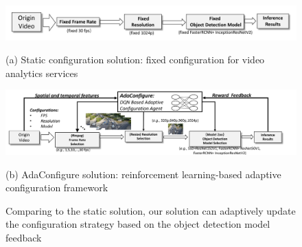\begin{figure}[!t]
	\begin{minipage}{\linewidth}
		\centerline{\includegraphics[width=0.9\linewidth]{figures/static_framework.pdf}}
		\begin{center}
			{(a) Static configuration solution: fixed configuration for video analytics services}
		\end{center}
	\end{minipage}
	\vfill
	\vspace{0.4cm}
	\begin{minipage}{\linewidth}
		\centerline{\includegraphics[width=0.9\linewidth]{figures/auto_framework.pdf}}
		\vspace{0.2cm}
		\begin{center}
			{(b) AdaConfigure solution: reinforcement learning-based adaptive configuration framework}
		\end{center}
	\end{minipage}
	\caption{Comparing to the static solution, our solution can adaptively update the configuration strategy based on the object detection model feedback}
	\label{fig: framework}
\end{figure}

